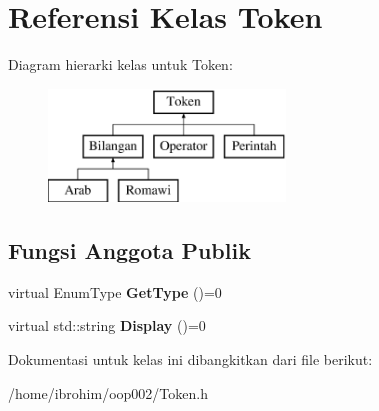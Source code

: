 \hypertarget{classToken}{}\section{Referensi Kelas Token}
\label{classToken}
Diagram hierarki kelas untuk Token\+:\begin{figure}[H]
\begin{center}
\leavevmode
\includegraphics[height=3.000000cm]{d2/d6e/classToken}
\end{center}
\end{figure}
\subsection*{Fungsi Anggota Publik}
\begin{DoxyCompactItemize}
\item 
\hypertarget{classToken_a86f97e77bdba8277b58ead29d3ef3584}{}virtual Enum\+Type {\bfseries Get\+Type} ()=0\label{classToken_a86f97e77bdba8277b58ead29d3ef3584}

\item 
\hypertarget{classToken_a89fa3f496f16d14fcf4b4f1a4047229b}{}virtual std\+::string {\bfseries Display} ()=0\label{classToken_a89fa3f496f16d14fcf4b4f1a4047229b}

\end{DoxyCompactItemize}


Dokumentasi untuk kelas ini dibangkitkan dari file berikut\+:\begin{DoxyCompactItemize}
\item 
/home/ibrohim/oop002/Token.\+h\end{DoxyCompactItemize}
